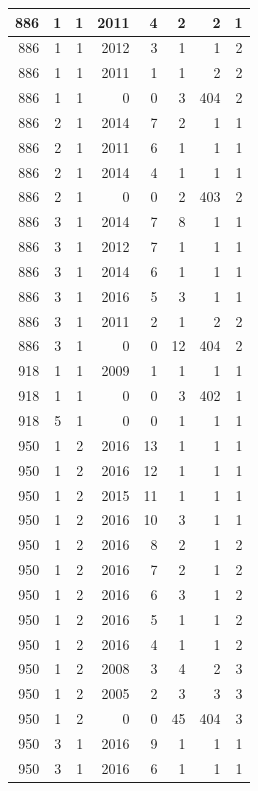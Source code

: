 \documentclass[11pt,]{book}
\begin{document}
\begin{table}
\begin{tabular}[t]{r|r|r|r|r|r|r|r}
886 & 1 & 1 & 2011 & 4 & 2 & 2 & 1\\
\hline
886 & 1 & 1 & 2012 & 3 & 1 & 1 & 2\\
\hline
886 & 1 & 1 & 2011 & 1 & 1 & 2 & 2\\
\hline
886 & 1 & 1 & 0 & 0 & 3 & 404 & 2\\
\hline
886 & 2 & 1 & 2014 & 7 & 2 & 1 & 1\\
\hline
886 & 2 & 1 & 2011 & 6 & 1 & 1 & 1\\
\hline
886 & 2 & 1 & 2014 & 4 & 1 & 1 & 1\\
\hline
886 & 2 & 1 & 0 & 0 & 2 & 403 & 2\\
\hline
886 & 3 & 1 & 2014 & 7 & 8 & 1 & 1\\
\hline
886 & 3 & 1 & 2012 & 7 & 1 & 1 & 1\\
\hline
886 & 3 & 1 & 2014 & 6 & 1 & 1 & 1\\
\hline
886 & 3 & 1 & 2016 & 5 & 3 & 1 & 1\\
\hline
886 & 3 & 1 & 2011 & 2 & 1 & 2 & 2\\
\hline
886 & 3 & 1 & 0 & 0 & 12 & 404 & 2\\
\hline
918 & 1 & 1 & 2009 & 1 & 1 & 1 & 1\\
\hline
918 & 1 & 1 & 0 & 0 & 3 & 402 & 1\\
\hline
918 & 5 & 1 & 0 & 0 & 1 & 1 & 1\\
\hline
950 & 1 & 2 & 2016 & 13 & 1 & 1 & 1\\
\hline
950 & 1 & 2 & 2016 & 12 & 1 & 1 & 1\\
\hline
950 & 1 & 2 & 2015 & 11 & 1 & 1 & 1\\
\hline
950 & 1 & 2 & 2016 & 10 & 3 & 1 & 1\\
\hline
950 & 1 & 2 & 2016 & 8 & 2 & 1 & 2\\
\hline
950 & 1 & 2 & 2016 & 7 & 2 & 1 & 2\\
\hline
950 & 1 & 2 & 2016 & 6 & 3 & 1 & 2\\
\hline
950 & 1 & 2 & 2016 & 5 & 1 & 1 & 2\\
\hline
950 & 1 & 2 & 2016 & 4 & 1 & 1 & 2\\
\hline
950 & 1 & 2 & 2008 & 3 & 4 & 2 & 3\\
\hline
950 & 1 & 2 & 2005 & 2 & 3 & 3 & 3\\
\hline
950 & 1 & 2 & 0 & 0 & 45 & 404 & 3\\
\hline
950 & 3 & 1 & 2016 & 9 & 1 & 1 & 1\\
\hline
950 & 3 & 1 & 2016 & 6 & 1 & 1 & 1\\
\hline

\end{tabular}
\end{table}
\end{document}
